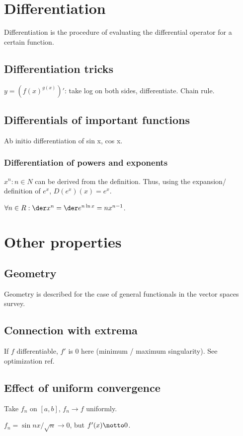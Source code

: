 \documentclass[oneside, article]{memoir}
\begin{document}
\section{Differentiation}
Differentiation is the procedure of evaluating the differential operator for a certain function.

\subsection{Differentiation tricks}
$y=(f(x)^{g(x)})'$: take log on both sides, differentiate. Chain rule.

\subsection{Differentials of important functions}
Ab initio differentiation of sin x, cos x.

\subsubsection{Differentiation of powers and exponents}
$x^{n} :n \in N$ can be derived from the definition. Thus, using the expansion/ definition of $e^{x}$, $D(e^{x})(x) = e^{x}$.

$\forall n\in R: \der x^{n} = \der e^{n\ln x} = nx^{n-1}$.

\section{Other properties}
\subsection{Geometry}
Geometry is described for the case of general functionals in the vector spaces survey.

\subsection{Connection with extrema}
If $f$ differentiable, $f'$ is $0$ here (minimum / maximum singularity). See optimization ref.

\subsection{Effect of uniform convergence}
Take $f_{n}$ on $[a, b]$, $f_{n} \to f$ uniformly.

$f_{n} = \sin nx/\sqrt{n} \to 0$, but $f'(x) \notto 0$.
\end{document}
